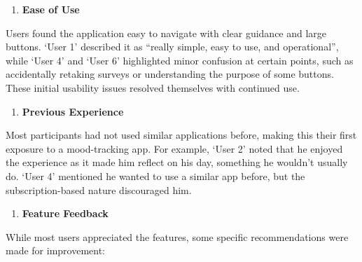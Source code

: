 \begin{enumerate}[resume]
    \item \textbf{Ease of Use}
\end{enumerate}

\noindent Users found the application easy to navigate with clear guidance and large buttons. `User 1' described it as ``really simple, easy to use, and operational'', while `User 4' and `User 6' highlighted minor confusion at certain points, such as accidentally retaking surveys or understanding the purpose of some buttons. These initial usability issues resolved themselves with continued use.

\begin{enumerate}[resume]
    \item \textbf{Previous Experience}
\end{enumerate}

\noindent Most participants had not used similar applications before, making this their first exposure to a mood-tracking app. For example, `User 2' noted that he enjoyed the experience as it made him reflect on his day, something he wouldn’t usually do. `User 4' mentioned he wanted to use a similar app before, but the subscription-based nature discouraged him.

\begin{enumerate}[resume]
    \item \textbf{Feature Feedback}
\end{enumerate}

\noindent While most users appreciated the features, some specific recommendations were made for improvement:

